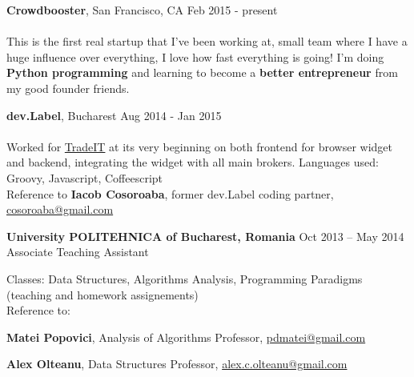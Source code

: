 \documentclass[margin,line]{resume}
\begin{document}
\begin{resume}
    \vspace{1.2mm}\textbf{Crowdbooster}, San Francisco, CA
        \hfill Feb 2015 - present\vspace{1mm}\\
    \selectfont{Software Developer}\vspace{1.2mm}\\
    {\fontsize{2.65mm}{1em}\selectfont
     This is the first real startup that I've been working at, small team where I have a huge influence over everything, I love how fast everything is going! I'm doing \textbf{Python programming} and learning to become a \textbf{better entrepreneur} from my good founder friends.
    }

    \vspace{1.2mm}\textbf{dev.Label}, Bucharest
        \hfill Aug 2014 - Jan 2015\vspace{1mm}\\
    \selectfont{Frontend \& Backend Developer}\vspace{1.2mm}\\
    {\fontsize{2.65mm}{1em}\selectfont
      Worked for \href{https://www.trade.it/}{TradeIT} at its very beginning on both frontend for browser widget and backend, integrating the widget with all main brokers.
      Languages used: Groovy, Javascript, Coffeescript\\
      Reference to \textbf{Iacob Cosoroaba}, former dev.Label coding partner, \href{mailto:cosoroaba@gmail.com}{cosoroaba@gmail.com}
     }

    \vspace{1.2mm}\textbf{University POLITEHNICA of Bucharest, Romania}
        \hfill Oct 2013 -- May 2014\vspace{1mm}\\
        Associate Teaching Assistant\vspace{1.2mm}\\
    {\fontsize{2.65mm}{1em}\selectfont
      Classes: Data Structures, Algorithms Analysis, Programming Paradigms (teaching and homework assignements)\\
      Reference to:
      \begin{list2}
          \item \textbf{Matei Popovici}, Analysis of Algorithms Professor, \href{mailto:pdmatei@gmail.com}{pdmatei@gmail.com}
          \item \textbf{Alex Olteanu}, Data Structures Professor, \href{mailto:alex.c.olteanu@gmail.com}{alex.c.olteanu@gmail.com}
      \end{list2}
    }


\end{resume}
\end{document}
